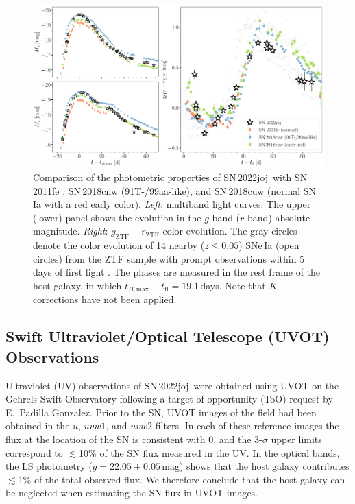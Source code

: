 \documentclass[twocolumn]{aastex631}
\newcommand{\sn}{SN\,2022joj}
\begin{document}
\begin{CJK*}{UTF8}{gbsn}
\begin{figure}
    \centering
    \includegraphics[width=\textwidth]{photometry.pdf}
    \caption{Comparison of the photometric properties of \sn\ with SN\,2011fe \citep[normal SN\,Ia;][]{Pereira_2013}, SN\,2018cnw (91T-/99aa-like), and SN\,2018cuw (normal SN\,Ia with a red early color). \textit{Left}: multiband light curves. The upper (lower) panel shows the evolution in the $g$-band ($r$-band) absolute magnitude.
    \textit{Right}: $g_\mathrm{ZTF}-r_\mathrm{ZTF}$ color evolution. 
    The gray circles denote the color evolution of 14 nearby ($z\le0.05$) SNe\,Ia (open circles) from the ZTF sample with prompt observations within 5\,days of first light \citep{Bulla2020}. The phases are measured in the rest frame of the host galaxy, in which $t_{B, \mathrm{max}} - t_\mathrm{fl}=19.1$\,days. Note that $K$-corrections have not been applied.}
    \label{fig:lc}
\end{figure}

\subsection{Swift Ultraviolet/Optical Telescope (UVOT) Observations}
Ultraviolet (UV) observations of \sn\ were obtained using UVOT \citep{UVOT_2005} on the Gehrels Swift Observatory \citep[Swift;][]{Swift_2004} following a target-of-opportunity (ToO) request by E.~Padilla Gonzalez. Prior to the SN, UVOT images of the field had been obtained in the $u$, $uvw1$, and $uvw2$ filters. In each of these reference images the flux at the location of the SN is consistent with 0, and the 3-$\sigma$ upper limits correspond to $\lesssim$10\% of the SN flux measured in the UV. In the optical bands, the LS photometry ($g = 22.05\pm0.05$\,mag) shows that the host galaxy contributes $\lesssim$1\% of the total observed flux. We therefore conclude that the host galaxy can be neglected when estimating the SN flux in UVOT images.


\end{CJK*}
\end{document}
